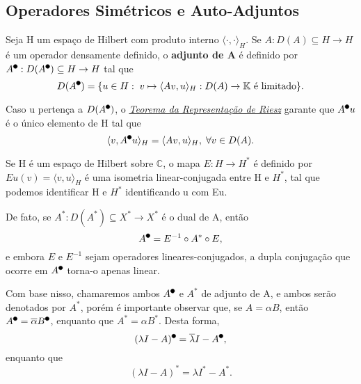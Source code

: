 \documentclass[../functional_analysis.tex]{subfiles}
\begin{document}
\subsection{Operadores Simétricos e Auto-Adjuntos}
\begin{def*}
	Seja H um espaço de Hilbert com produto interno \(\langle \cdot , \cdot  \rangle_{H}\). Se \(A:D(A)\subseteq H\rightarrow H\) é um operador densamente definido, o \textbf{adjunto de A} é definido por
	\(A^{\tikz[baseline=-0.5ex]\draw[black, fill=black, radius=2pt](0, 0)circle;}:D(A^{\tikz[baseline=-0.5ex]\draw[black, fill=black, radius=2pt](0, 0)circle;})\subseteq H\rightarrow H\)
	tal que
	\[
		D(A^{\tikz[baseline=-0.5ex]\draw[black, fill=black, radius=2pt](0, 0)circle;}) = \{u\in H:\; v\mapsto \langle Av, u \rangle_{H}:D(A)\rightarrow \mathbb{K} \text{ é limitado}\}.
	\]
\end{def*}
Caso u pertença a \(D(A^{\tikz[baseline=-0.5ex]\draw[black, fill=black, radius=2pt](0, 0)circle;})\), o \hyperlink{riesz_representation}{\textit{Teorema da Representação de Riesz}} garante que \(A^{\tikz[baseline=-0.5ex]\draw[black, fill=black, radius=2pt](0, 0)circle;}u\) é o
único elemento de H tal que
\[
	\langle v, A^{\tikz[baseline=-0.5ex]\draw[black, fill=black, radius=2pt](0, 0)circle;}u \rangle_{H} = \langle Av, u \rangle_{H},\; \forall v\in D(A).
\]
\begin{tcolorbox}[
		skin=enhanced,
		title=Observação,
		fonttitle=\bfseries,
		colframe=black,
		colbacktitle=cyan!75!white,
		colback=cyan!15,
		colbacklower=black,
		coltitle=black,
		drop fuzzy shadow,
	]
	Se H é um espaço de Hilbert sobre \(\mathbb{C}\), o mapa \(E:H\rightarrow H^{*}\) é definido por \(Eu(v) = \langle v, u \rangle_{H}\) é uma isometria
	linear-conjugada entre H e \(H^{*}\), tal que podemos identificar H e \(H^{*}\) identificando u com Eu.

	De fato, se \(A^{*}:D(A^{*})\subseteq X^{*}\rightarrow X^{*}\) é o dual de A, então
	\[
		A^{\tikz[baseline=-0.5ex]\draw[black, fill=black, radius=2pt](0, 0)circle;} = E^{-1}\circ A^{*}\circ E,
	\]
	e embora \(E\) e \(E^{-1}\) sejam operadores lineares-conjugados, a dupla conjugação que ocorre em \(A^{\tikz[baseline=-0.5ex]\draw[black, fill=black, radius=2pt](0, 0)circle;}\) torna-o
	apenas linear.

	Com base nisso, chamaremos ambos \(A^{\tikz[baseline=-0.5ex]\draw[black, fill=black, radius=2pt](0, 0)circle;}\) e \(A^{*}\) de adjunto de A, e ambos serão denotados por \(A^{*}\), porém é importante
	observar que, se \(A = \alpha B\), então \(A^{\tikz[baseline=-0.5ex]\draw[black, fill=black, radius=2pt](0, 0)circle;} = \overline{\alpha }B^{\tikz[baseline=-0.5ex]\draw[black, fill=black, radius=2pt](0, 0)circle;}\),
	enquanto que \(A^{*} = \alpha B^{*}\). Desta forma,
	\[
		(\lambda I - A)^{\tikz[baseline=-0.5ex]\draw[black, fill=black, radius=2pt](0, 0)circle;} = \overline{\lambda }I - A^{\tikz[baseline=-0.5ex]\draw[black, fill=black, radius=2pt](0, 0)circle;},
	\]
	enquanto que
	\[
		(\lambda I - A)^{*} = \lambda I^{*} - A^{*}.
	\]
\end{tcolorbox}
\end{document}
